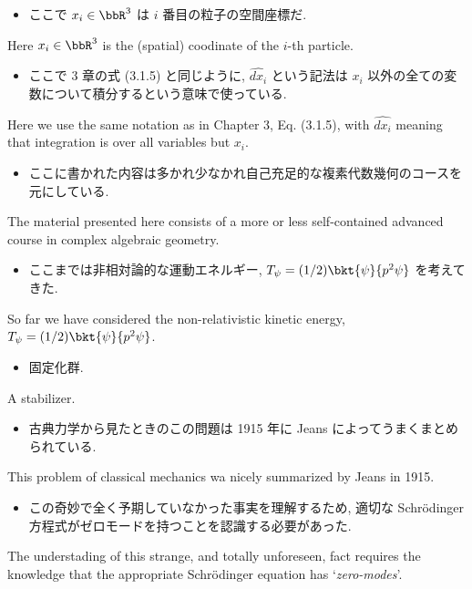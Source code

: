 \documentclass[openany, a4paper, oneside]{jsbook}
\begin{document}
\begin{itemize}
\item ここで $x_i \in \bbR^3$ は $i$ 番目の粒子の空間座標だ. \cite{LiebSeiringer1}
\end{itemize}
Here $x_i \in \bbR^3$ is the (spatial) coodinate of the $i$-th particle.

\begin{itemize}
\item ここで 3 章の式 (3.1.5) と同じように, $\hat{dx_i}$ という記法は $x_i$ 以外の全ての変数について積分するという意味で使っている. \cite{LiebSeiringer1}
\end{itemize}
Here we use the same notation as in Chapter 3, Eq. (3.1.5), with $\hat{dx_i}$
meaning that integration is over all variables but $x_i$.

\begin{itemize}
\item ここに書かれた内容は多かれ少なかれ自己充足的な複素代数幾何のコースを元にしている. \cite{ChrisPeters1}
\end{itemize}
The material presented here consists of a more or less
self-contained advanced course in complex algebraic geometry.

\begin{itemize}
\item ここまでは非相対論的な運動エネルギー, $T_{\psi} = (1/2) \bkt{\psi}{p^2 \psi}$ を考えてきた. \cite{LiebSeiringer1}
\end{itemize}
So far we have considered the non-relativistic kinetic energy, $T_{\psi} = (1/2) \bkt{\psi}{p^2 \psi}$.

\begin{itemize}
\item 固定化群.
\end{itemize}
A stabilizer.

\begin{itemize}
\item 古典力学から見たときのこの問題は 1915 年に Jeans によってうまくまとめられている. \cite{LiebSeiringer1}
\end{itemize}
This problem of classical mechanics wa nicely summarized by Jeans in 1915.

\begin{itemize}
\item この奇妙で全く予期していなかった事実を理解するため, 適切な Schr\"odinger 方程式がゼロモードを持つことを認識する必要があった.
\end{itemize}
The understading of this strange, and totally unforeseen, fact requires the knowledge that the
appropriate Schr\"odinger equation has `\textit{zero-modes}'.
\end{document}
